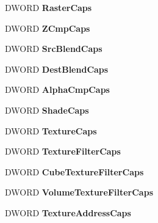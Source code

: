 \begin{DoxyCompactItemize}
\item 
\mbox{\label{struct___d3_d_c_a_p_s9_a39b15ef9aaeff7babf21f312e0f79142}} 
D\+W\+O\+RD {\bfseries Raster\+Caps}
\item 
\mbox{\label{struct___d3_d_c_a_p_s9_a7951bd48102658d77e5c43a4a9d8091a}} 
D\+W\+O\+RD {\bfseries Z\+Cmp\+Caps}
\item 
\mbox{\label{struct___d3_d_c_a_p_s9_ac914f6d312dd9ed178c07de6a7273705}} 
D\+W\+O\+RD {\bfseries Src\+Blend\+Caps}
\item 
\mbox{\label{struct___d3_d_c_a_p_s9_a36d304d40f1c369ac88d0ed3079d6360}} 
D\+W\+O\+RD {\bfseries Dest\+Blend\+Caps}
\item 
\mbox{\label{struct___d3_d_c_a_p_s9_ad58211996fcdb32459653b22131b5ce3}} 
D\+W\+O\+RD {\bfseries Alpha\+Cmp\+Caps}
\item 
\mbox{\label{struct___d3_d_c_a_p_s9_a52f49ada457e1873aa9e64cff625b247}} 
D\+W\+O\+RD {\bfseries Shade\+Caps}
\item 
\mbox{\label{struct___d3_d_c_a_p_s9_ada909138ff3478c38c239f1b348f429e}} 
D\+W\+O\+RD {\bfseries Texture\+Caps}
\item 
\mbox{\label{struct___d3_d_c_a_p_s9_a4d61c927a3f124f447b968461f3f11bc}} 
D\+W\+O\+RD {\bfseries Texture\+Filter\+Caps}
\item 
\mbox{\label{struct___d3_d_c_a_p_s9_aa8a55abbdcd3a2f94459f878d84b7f4e}} 
D\+W\+O\+RD {\bfseries Cube\+Texture\+Filter\+Caps}
\item 
\mbox{\label{struct___d3_d_c_a_p_s9_aea9428d4a42d86a43c70081049fabc56}} 
D\+W\+O\+RD {\bfseries Volume\+Texture\+Filter\+Caps}
\item 
\mbox{\label{struct___d3_d_c_a_p_s9_ab397245dc72282554fd7ef29a66861af}} 
D\+W\+O\+RD {\bfseries Texture\+Address\+Caps}
\item 

\end{DoxyCompactItemize}
